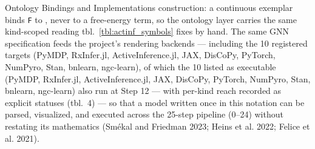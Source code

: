 \documentclass[
  ignorenonframetext,
]{beamer}
\begin{document}
\begin{frame}{Ontology Bindings and
Implementations}
construction: a continuous exemplar binds \texttt{F} to
, never to a free-energy term, so the
ontology layer carries the same kind-scoped reading
tbl.~\ref{tbl:actinf_symbols} fixes by hand. The same GNN specification
feeds the project's rendering backends --- including the 10 registered
targets (PyMDP, RxInfer.jl, ActiveInference.jl, JAX, DisCoPy, PyTorch,
NumPyro, Stan, bnlearn, ngc-learn), of which the 10 listed as executable
(PyMDP, RxInfer.jl, ActiveInference.jl, JAX, DisCoPy, PyTorch, NumPyro,
Stan, bnlearn, ngc-learn) also run at Step 12 --- with per-kind reach
recorded as explicit statuses (tbl.~4) ---
so that a model written once in this notation can be parsed, visualized,
and executed across the 25-step pipeline (0--24) without restating its
mathematics (Smékal and Friedman 2023; Heins et al. 2022; Felice et al.
2021).
\end{frame}
\end{document}
